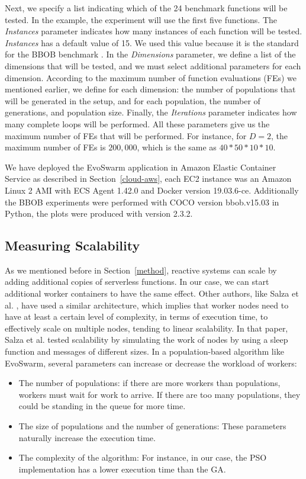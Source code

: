 \documentclass[review]{elsarticle}
\begin{document}
Next, we specify a list indicating which of the 24 benchmark
functions will be tested. In the example, the experiment will use the first five
functions.  The {\em Instances} parameter indicates how many instances of each
function will be tested. {\em Instances}  has a default value of 15. We used this
value because it is the standard for the BBOB benchmark \cite{hansen2016coco}.
In the {\em Dimensions} parameter, we define a list of the dimensions that will
be tested, and we must select additional parameters for each dimension.
According to the maximum number of function evaluations (FEs) we mentioned
earlier, we define for each dimension: the number of populations that will be
generated in the setup, and for each population,  the number of generations, and
population size. Finally, the {\em Iterations} parameter indicates how many
complete loops will be performed. All these parameters give us the maximum
number of FEs that will be performed. For instance, for $D = 2$, the maximum
number of FEs is $200,000$, which is the same as $40*50*10*10$.

We have deployed the EvoSwarm application in Amazon Elastic Container Service as 
described in Section~\ref{cloud-aws}, each EC2 instance was an Amazon Linux 2 AMI with 
ECS Agent 1.42.0 and Docker version 19.03.6-ce.
Additionally the BBOB experiments were performed with COCO \cite{hansen2016coco} version bbob.v15.03
in Python, the plots were produced with version 2.3.2.

\subsection{Measuring Scalability}
\label{sec:exp1}

As we mentioned before in Section~\ref{method}, reactive systems can scale by adding additional copies
of serverless functions. In our case, we can start additional worker containers
to have the same effect. Other authors, like Salza et al. \cite{salza2019speed},
have used a similar architecture, which implies that worker nodes need to have at least a certain level
of complexity, in terms of execution time,  to effectively scale on multiple
nodes, tending to linear scalability. In that paper, Salza et al. tested scalability
by simulating the work of nodes by using a sleep function and messages of different sizes.
In a population-based algorithm like EvoSwarm, several parameters can increase or 
decrease the workload of workers:

\begin{itemize}
    \item The number of populations: if there are more workers than populations, workers
    must wait for work to arrive. If there are too many populations, they could be
    standing in the queue for more time.
    \item The size of populations and the number of generations:
    These parameters naturally increase the execution time.
    \item The complexity of the algorithm: For instance, in our case,
    the PSO implementation has a lower execution time than the GA.
\end{itemize}
\end{document}
